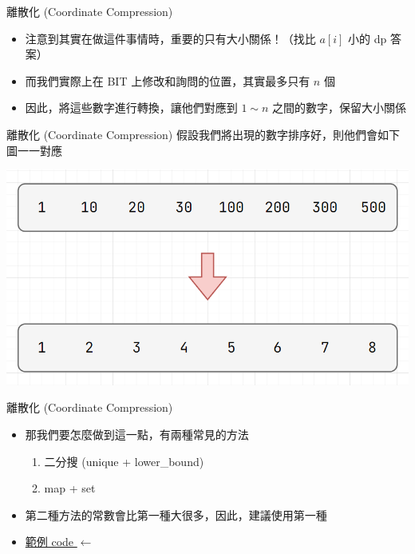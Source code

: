 \documentclass[aspectratio=169]{beamer}
\begin{document}
    \begin{frame}{離散化 (Coordinate Compression)}
        \begin{itemize}
            \item 注意到其實在做這件事情時，重要的只有大小關係！（找比 $a[i]$ 小的 dp 答案）
            \item 而我們實際上在 BIT 上修改和詢問的位置，其實最多只有 $n$ 個
            \item<2-> 因此，將這些數字進行轉換，讓他們對應到 $1 \sim n$ 之間的數字，保留大小關係
        \end{itemize}
    \end{frame}

    \begin{frame}{離散化 (Coordinate Compression)}
        假設我們將出現的數字排序好，則他們會如下圖一一對應
        \begin{center}
            \includegraphics[scale=0.3]{coordinate compression/coordinate_compression.png}
        \end{center}
    \end{frame}

    \begin{frame}{離散化 (Coordinate Compression)}
        \begin{itemize}
            \item 那我們要怎麼做到這一點，有兩種常見的方法
            \begin{enumerate}
                \item 二分搜 (unique + lower\_bound)
                \item map + set
            \end{enumerate}
            \item 第二種方法的常數會比第一種大很多，因此，建議使用第一種
            \vspace{1cm}
            \item<2-> \href{https://cses.fi/paste/7b8182985ab6276b4713df/}{範例 code $\leftarrow$}
        \end{itemize}
    \end{frame}
\end{document}
